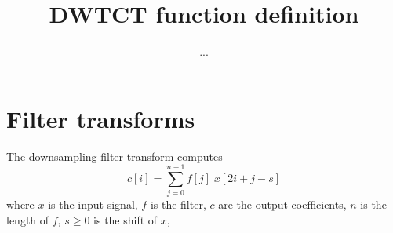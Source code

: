 \documentclass[a4paper,11pt]{article}
\title{DWTCT function definition}
\author{...}
\newcommand{\subsc}[1]{[#1]}
\begin{document}
\maketitle

\section{Filter transforms}

The downsampling filter transform computes
\begin{equation}
	c\subsc{i} = \sum_{j=0}^{n-1} f\subsc{j} \; x\subsc{2i + j - s} 
\end{equation}
where $x$ is the input signal, $f$ is the filter, $c$ are the output coefficients, $n$ is the length of $f$, $s\geq0$ is the shift of $x$,
\end{document}
